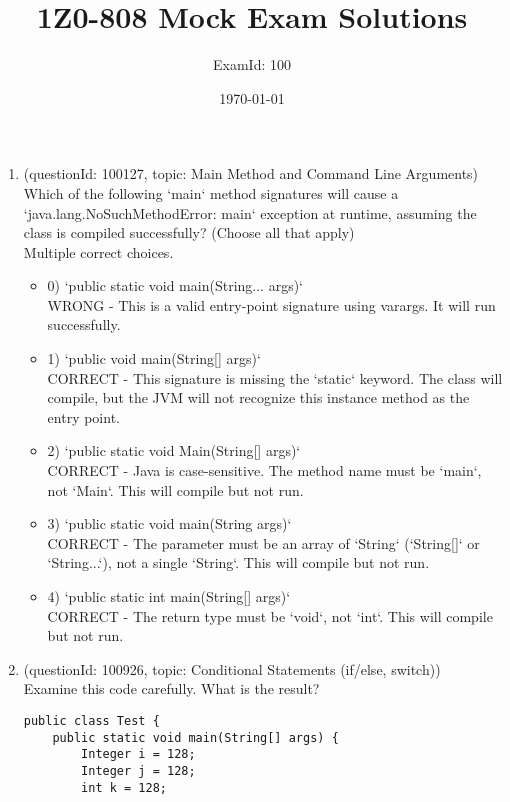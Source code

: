 \documentclass[12pt]{article}
\title{\textbf{1Z0-808 Mock Exam Solutions}}
\author{ExamId: 100}
\date{\today}
\begin{document}
\maketitle
\newpage\begin{enumerate}[label=(\arabic*)]
\item (questionId: 100127, topic: Main Method and Command Line Arguments) \\ 
Which of the following `main` method signatures will cause a `java.lang.NoSuchMethodError: main` exception at runtime, assuming the class is compiled successfully? (Choose all that apply)
\\ \noindent Multiple correct choices. 
\begin{itemize}
\item 0) `public static void main(String... args)`
 \\ 
WRONG - This is a valid entry-point signature using varargs. It will run successfully.

\item 1) `public void main(String[] args)`
 \\ 
CORRECT - This signature is missing the `static` keyword. The class will compile, but the JVM will not recognize this instance method as the entry point.

\item 2) `public static void Main(String[] args)`
 \\ 
CORRECT - Java is case-sensitive. The method name must be `main`, not `Main`. This will compile but not run.

\item 3) `public static void main(String args)`
 \\ 
CORRECT - The parameter must be an array of `String` (`String[]` or `String...`), not a single `String`. This will compile but not run.

\item 4) `public static int main(String[] args)`
 \\ 
CORRECT - The return type must be `void`, not `int`. This will compile but not run.

\end{itemize}
\item (questionId: 100926, topic: Conditional Statements (if/else, switch)) \\ 
Examine this code carefully. What is the result?\n\begin{verbatim}
public class Test {
    public static void main(String[] args) {
        Integer i = 128;
        Integer j = 128;
        int k = 128;


\end{verbatim}
\end{enumerate}
\end{document}
